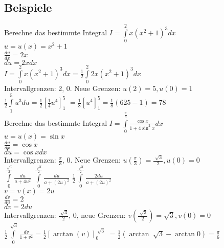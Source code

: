 \documentclass[../main.tex]{subfiles}
\begin{document}
\subsection{Beispiele}
Berechne das bestimmte Integral $I = \int\limits_0^2 x(x^2+1)^3dx$ \\
$u = u(x)=  x^2 + 1$ \\
$\frac{du}{dx} = 2x$ \\
$du = 2xdx$ \\
$I = \int\limits_0^2 x(x^2+1)^3dx = \frac{1}{2} \int\limits_0^2 2x(x^2+1)^3dx$ \\
Intervallgrenzen: 2, 0. Neue Grenzen: $u(2)=5, u(0)=1$ \\
$\frac{1}{2} \int\limits_1^5 u^3du = \frac{1}{2} \left[ \frac{1}{4} u^4\right]_1^5$
$ = \frac{1}{8} \left[ u^4\right]_1^5 = \frac{1}{8}(625 - 1) = 78$
\\ [14pt]
Berechne das bestimmte Integral $I = \int\limits_0^{\frac{\pi}{3}}\frac{\cos x}{1 + 4\sin ^2 x}dx$ \\
$u = u(x)=  \sin x$ \\
$\frac{du}{dx} = \cos x$ \\
$du = \cos xdx$ \\
Intervallgrenzen: $\frac{\pi}{3}$, 0. Neue Grenzen: $u(\frac{\pi}{3})=\frac{\sqrt[]{3}}{2}, u(0)=0$ \\ [7pt]
$\int\limits_0^{\frac{\sqrt[]{3}}{2}} \frac{du}{a+4u^2}$
$\int\limits_0^{\frac{\sqrt[]{3}}{2}} \frac{du}{a+(2u)^2}$
$\frac{1}{2}\int\limits_0^{\frac{\sqrt[]{3}}{2}} \frac{2du}{a+(2u)^2}$ \\
$v = v(x)=  2u$ \\
$\frac{dv}{du} = 2$ \\
$dv = 2du$ \\
Intervallgrenzen: $\frac{\sqrt[]{3}}{2}$, $0$, neue Grenzen: $v(\frac{\sqrt[]{3}}{2}) = \sqrt{3}, v(0) = 0$ \\
$\frac{1}{2}\int\limits_0^{\sqrt[]{3}}\frac{dv}{1+v^2} = \frac{1}{2} \left[ \arctan (v)\right]_0^{\sqrt[]{3}}$
$ = \frac{1}{2}(\arctan \sqrt[]{3} - \arctan 0) = \frac{\pi}{6}$
\end{document}
